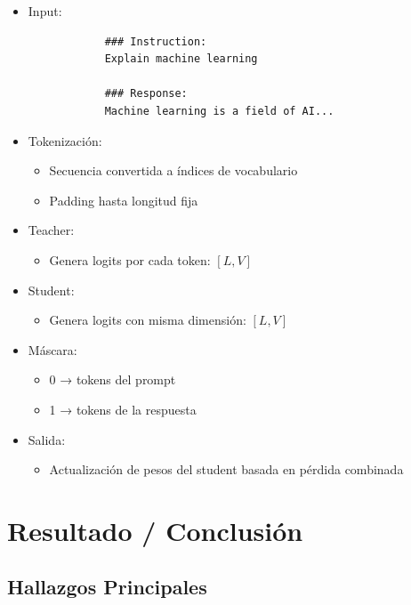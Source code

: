 \documentclass[12pt]{article}
\begin{document}
	\begin{itemize}
		\item Input:
		\begin{verbatim}
			### Instruction:
			Explain machine learning
			
			### Response:
			Machine learning is a field of AI...
		\end{verbatim}
		
		\item Tokenización:
		\begin{itemize}
			\item Secuencia convertida a índices de vocabulario
			\item Padding hasta longitud fija
		\end{itemize}
		
		\item Teacher:
		\begin{itemize}
			\item Genera logits por cada token: $[L, V]$
		\end{itemize}
		
		\item Student:
		\begin{itemize}
			\item Genera logits con misma dimensión: $[L, V]$
		\end{itemize}
		
		\item Máscara:
		\begin{itemize}
			\item 0 → tokens del prompt
			\item 1 → tokens de la respuesta
		\end{itemize}
		
		\item Salida:
		\begin{itemize}
			\item Actualización de pesos del student basada en pérdida combinada
		\end{itemize}
	\end{itemize}
	
	\section{Resultado / Conclusión}
	
	\subsection{Hallazgos Principales}
	
\end{document}
